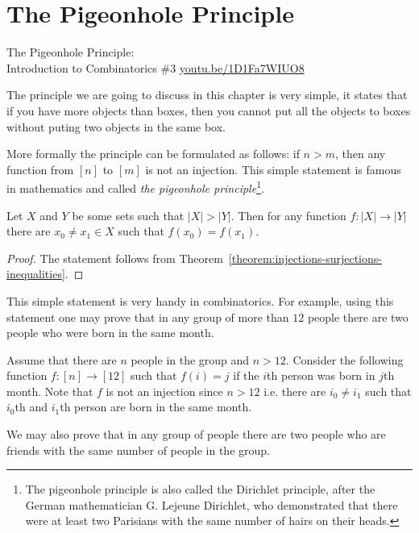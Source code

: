 \chapter{The Pigeonhole Principle}
\begin{marginfigure}
  {\scriptsize The Pigeonhole Principle:\\\noindent
  Introduction to Combinatorics \#3}
  \vskip 0.25cm
  \noindent
  \vskip 0.25cm
  \noindent
  \url{youtu.be/1D1Fa7WIUO8}
\end{marginfigure}
The principle we are going to discuss in this chapter is very simple, it states
that if you have more objects than boxes, then you cannot put all the objects to
boxes without puting two objects in the same box.

More formally the principle can be formulated as follows: if $n > m$, then any
function from $[n]$ to $[m]$ is not an injection. This simple statement is
famous in mathematics and called \textit{the pigeonhole principle}\footnote{%
  The pigeonhole principle is also called the Dirichlet principle, after the
  German mathematician G. Lejeune Dirichlet, who demonstrated that there were
  at least two Parisians with the same number of hairs on their heads.
}.

\begin{theorem}
  Let $X$ and $Y$ be some sets such that $|X| > |Y|$. Then for any function
  $f : |X| \to |Y|$ there are $x_0 \neq x_1 \in X$ such that $f(x_0) = f(x_1)$.
\end{theorem}
\begin{proof}
  The statement follows from
  Theorem~\ref{theorem:injections-surjections-inequalities}.
\end{proof}

This simple statement is very handy in combinatorics. For example, using this
statement one may prove that in any group of more than $12$ people there are
two people who were born in the same month.

Assume that there are $n$ people in the group and $n > 12$.
Consider the following function $f : [n] \to [12]$ such that $f(i) = j$ if the
$i$th person was born in $j$th month. Note that $f$ is not an injection since
$n > 12$ i.e. there are $i_0 \neq i_1$ such that $i_0$th and $i_1$th person are
born in the same month.

We may also prove that in any group of people there are two people who are
friends with the same number of people in the group.

